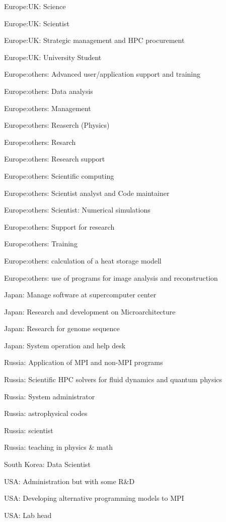 \item Europe:UK: Science
\item Europe:UK: Scientist
\item Europe:UK: Strategic management and HPC procurement
\item Europe:UK: University Student
\item Europe:others: Advanced user/application support and training
\item Europe:others: Data analysis
\item Europe:others: Management
\item Europe:others: Reaserch (Physics)
\item Europe:others: Resarch
\item Europe:others: Research support
\item Europe:others: Scientific computing
\item Europe:others: Scientist analyst and Code maintainer
\item Europe:others: Scientist: Numerical simulations
\item Europe:others: Support for research
\item Europe:others: Training
\item Europe:others: calculation of a heat storage modell
\item Europe:others: use of programs for image analysis and reconstruction
\item Japan: Manage software at supercomputer center
\item Japan: Research and development on Microarchitecture
\item Japan: Research for genome sequence
\item Japan: System operation and help desk
\item Russia: Application of MPI and non-MPI programs
\item Russia: Scientific HPC solvers for fluid dynamics and quantum physics
\item Russia: System administrator
\item Russia: astrophysical codes
\item Russia: scientist
\item Russia: teaching in physics \& math
\item South Korea: Data Scientist
\item USA: Administration but with some R\&D
\item USA: Developing alternative programming models to MPI
\item USA: Lab head
